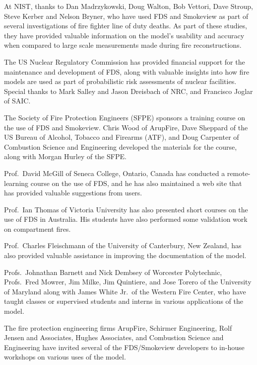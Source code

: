 \documentclass[11pt]{book}
\begin{document}
At NIST, thanks to Dan Madrzykowski, Doug Walton, Bob Vettori, Dave Stroup, Steve Kerber and Nelson Bryner,
who have used FDS and Smokeview as part of several investigations of fire fighter line of duty deaths.
As part of these studies, they have provided valuable information on the model's usability and accuracy
when compared to large scale measurements made during fire reconstructions.

The US Nuclear Regulatory Commission has provided financial support for the maintenance and development of FDS,
along with valuable insights into how fire models are used as part of probabilistic risk assessments of nuclear
facilities. Special thanks to Mark Salley and Jason Dreisbach of NRC, and Francisco Joglar of SAIC.

The Society of Fire Protection Engineers (SFPE) sponsors a training course on the use of FDS and Smokeview.
Chris Wood of ArupFire, Dave Sheppard of the US Bureau of Alcohol, Tobacco and Firearms (ATF), and
Doug Carpenter of Combustion Science and Engineering developed the materials for the course, along with
Morgan Hurley of the SFPE.

Prof.~David McGill of Seneca College, Ontario, Canada has conducted a remote-learning course
on the use of FDS, and he has also maintained a web site that has provided valuable suggestions from users.

Prof.~Ian Thomas of Victoria University has also presented short courses on the use of FDS in Australia.
His students have also performed some validation work on compartment fires.

Prof.~Charles Fleischmann of the University of Canterbury, New Zealand, has also provided valuable assistance
in improving the documentation of the model.

Profs.~Johnathan Barnett and Nick Dembsey of Worcester Polytechnic, Profs.~Fred Mowrer, Jim Milke, Jim Quintiere,
and Jose Torero of the University of Maryland along with James White Jr.~of the Western Fire Center, who have taught
classes or supervised students and interns in various applications of the model.

The fire protection engineering firms ArupFire, Schirmer Engineering, Rolf Jensen and Associates, Hughes Associates,
and Combustion Science and Engineering have invited several of the FDS/Smokeview developers to in-house workshops
on various uses of the model.



\tableofcontents

\mainmatter
\end{document}
